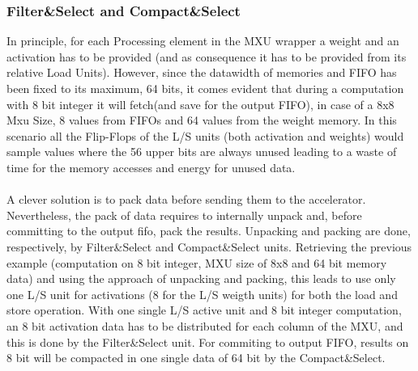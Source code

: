 \subsubsection{Filter\&Select and Compact\&Select}
In principle, for each Processing element in the MXU wrapper a weight and an activation has to be provided (and as consequence it has to be provided from its relative Load Units). However, since the datawidth of memories and FIFO has been fixed to its maximum, 64 bits, it comes evident that during a computation with 8 bit integer it will fetch(and save for the output FIFO), in case of a 8x8 Mxu Size, 8 values from FIFOs and 64 values from the weight memory. In this scenario all the Flip-Flops of the L/S units (both activation and weights) would sample values where the 56 upper bits are always unused leading to a waste of time for the memory accesses and energy for unused data.\\\\A clever solution is to pack data before sending them to the accelerator. Nevertheless, the pack of data requires to internally unpack and, before committing to the output fifo, pack the results.
Unpacking and packing are done, respectively, by Filter\&Select and Compact\&Select units.
Retrieving the previous example (computation on 8 bit integer, MXU size of 8x8 and 64 bit memory data) and using the approach of unpacking and packing, this leads to  use only one L/S unit for activations (8 for the L/S weigth units) for both the load and store operation. With one single L/S active unit and 8 bit integer computation, an  8 bit activation data has to be distributed for each column of the MXU, and this is done by the Filter\&Select unit. For commiting to output FIFO, results on 8 bit will be compacted in one single data of 64 bit by the Compact\&Select.\\


